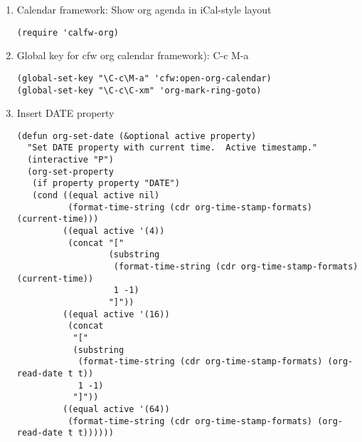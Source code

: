 \documentclass{article}
\begin{document}
\begin{enumerate}
\begin{verbatim}
(defun org-agenda-open-file ()
  "Open a file from the current agenda file list."
  (interactive)
  (let* ((menu (grizzl-make-index org-agenda-files))
        (answer (grizzl-completing-read "Choose an agenda file: " menu)))
    (find-file answer)))

(defun org-agenda-list-files ()
  "List the paths that are currently in org-agenda-files"
  (interactive)
  (let  ((menu (grizzl-make-index org-agenda-files)))
    (grizzl-completing-read "These are currently the files in list org-agenda-files. " menu)))

(defun org-agenda-list-menu ()
 "Present menu with commands for loading, saving, adding and removing
files to org-agenda-files."
 (interactive)
 (let* ((menu (grizzl-make-index
               '("org-agenda-save-file-list"
                 "org-agenda-load-file-list"
                 "org-agenda-list-files"
                 "org-agenda-open-file"
                 "org-agenda-add-this-file-to-agenda"
                 "org-agenda-remove-this-file-from-agenda")))
        (command (grizzl-completing-read "Choose a command: " menu)))
   (call-interactively (intern command))))

(global-set-key (kbd "H-a H-a") 'org-agenda-list-menu)
\end{verbatim}


\item Calendar framework: Show org agenda in iCal-style layout
\label{sec-2-5-8-3}

\begin{verbatim}
(require 'calfw-org)
\end{verbatim}

\item Global key for cfw org calendar framework): C-c M-a
\label{sec-2-5-8-4}

\begin{verbatim}
(global-set-key "\C-c\M-a" 'cfw:open-org-calendar)
(global-set-key "\C-c\C-xm" 'org-mark-ring-goto)
\end{verbatim}

\item Insert DATE property
\label{sec-2-5-8-5}

\begin{verbatim}
(defun org-set-date (&optional active property)
  "Set DATE property with current time.  Active timestamp."
  (interactive "P")
  (org-set-property
   (if property property "DATE")
   (cond ((equal active nil)
          (format-time-string (cdr org-time-stamp-formats) (current-time)))
         ((equal active '(4))
          (concat "["
                  (substring
                   (format-time-string (cdr org-time-stamp-formats) (current-time))
                   1 -1)
                  "]"))
         ((equal active '(16))
          (concat
           "["
           (substring
            (format-time-string (cdr org-time-stamp-formats) (org-read-date t t))
            1 -1)
           "]"))
         ((equal active '(64))
          (format-time-string (cdr org-time-stamp-formats) (org-read-date t t))))))


\end{verbatim}
\end{enumerate}
\end{document}
